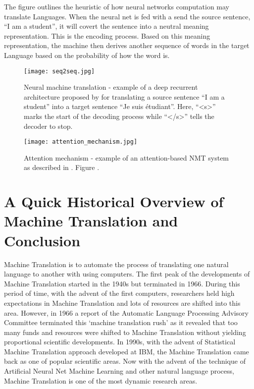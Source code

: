 The figure outlines the heuristic of how neural networks computation may translate Languages. When the neural net is fed with a send the source sentence, ``I am a student'', it will covert the sentence into a neutral meaning representation. This is the encoding process. Based on this meaning representation, the machine then derives another sequence of words in the target Language based on the probability of how the word is.  

\begin{figure}[h]
\caption{Neural machine translation - example of a deep recurrent architecture proposed by for translating a source sentence ``I am a student'' into a target sentence ``Je suis \'{e}tudiant''. Here, ``<s>'' marks the start of the decoding process while ``</s>'' tells the decoder to stop. \citep{luong17GitHub}}
\centering
\texttt{[image: seq2seq.jpg]}
\end{figure} 

\begin{figure}[h]
\caption{Attention mechanism - example of an attention-based NMT system as described in \citet{luong2015effective}. Figure \citep{luong17GitHub}.}
\centering
\texttt{[image: attention\_mechanism.jpg]}
\end{figure} 



\section{A Quick Historical Overview of Machine Translation and Conclusion}

Machine Translation is to automate the process of translating one natural language to another with using computers. The first peak of the developments of Machine Translation started in the 1940s but terminated in 1966. During this period of time, with the advent of the first computers, researchers held high expectations in Machine Translation and lots of resources are shifted into this area. However, in 1966 a report of the Automatic Language Processing Advisory Committee \citep{pierce1966language} terminated this `machine translation rush' as it revealed that too many funds and resources were shifted to Machine Translation without yielding proportional scientific developments. In 1990s, with the advent of Statistical Machine Translation approach developed at IBM, the Machine Translation came back as one of popular scientific areas. Now with the advent of the technique of Artificial Neural Net Machine Learning and other natural language process, Machine Translation is one of the most dynamic research areas.    
